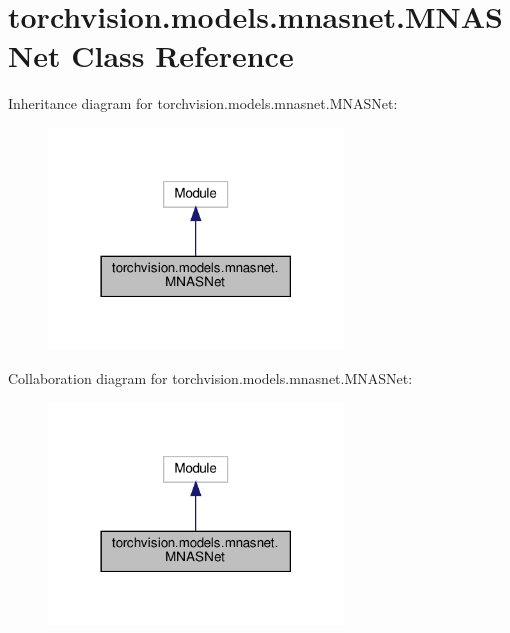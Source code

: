 \hypertarget{classtorchvision_1_1models_1_1mnasnet_1_1MNASNet}{}\section{torchvision.\+models.\+mnasnet.\+M\+N\+A\+S\+Net Class Reference}
\label{classtorchvision_1_1models_1_1mnasnet_1_1MNASNet}


Inheritance diagram for torchvision.\+models.\+mnasnet.\+M\+N\+A\+S\+Net\+:
\nopagebreak
\begin{figure}[H]
\begin{center}
\leavevmode
\includegraphics[width=222pt]{classtorchvision_1_1models_1_1mnasnet_1_1MNASNet__inherit__graph}
\end{center}
\end{figure}


Collaboration diagram for torchvision.\+models.\+mnasnet.\+M\+N\+A\+S\+Net\+:
\nopagebreak
\begin{figure}[H]
\begin{center}
\leavevmode
\includegraphics[width=222pt]{classtorchvision_1_1models_1_1mnasnet_1_1MNASNet__coll__graph}
\end{center}
\end{figure}
